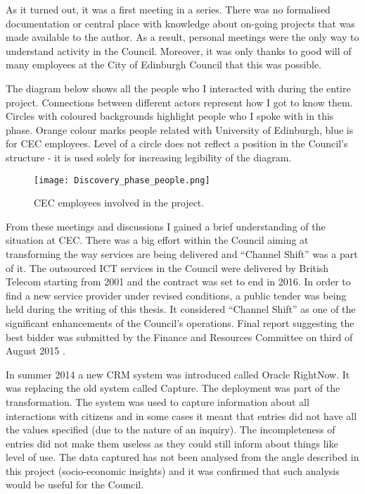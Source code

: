 As it turned out, it was a first meeting in a series. There was no formalised documentation or central place with knowledge about on-going projects that was made available to the author. As a result, personal meetings were the only way to understand activity in the Council. Moreover, it was only thanks to good will of many employees at the City of Edinburgh Council that this was possible.

The diagram below shows all the people who I interacted with during the entire project. Connections between different actors represent how I got to know them. Circles with coloured backgrounds highlight people who I spoke with in this phase. Orange colour marks people related with University of Edinburgh, blue is for CEC employees. Level of a circle does not reflect a position in the Council’s structure - it is used solely for increasing legibility of the diagram.

\begin{figure}
\centering
     \texttt{[image: Discovery\_phase\_people.png]}
      \caption{CEC employees involved in the project.}
       \label{normal_case}
\end{figure}


From these meetings and discussions I gained a brief understanding of the situation at CEC. There was a big effort within the Council aiming at transforming the way services are being delivered and “Channel Shift” was a part of it. The outsourced ICT services in the Council were delivered by British Telecom starting from 2001 and the contract was set to end in 2016. In order to find a new service provider under revised conditions, a public tender was being held during the writing of this thesis. It considered “Channel Shift” as one of the significant enhancements of the Council’s operations. Final report suggesting the best bidder was submitted by the Finance and Resources Committee on third of August 2015 \citep{FinanceandResourcesCommittee2016}.

In summer 2014 a new CRM system was introduced called Oracle RightNow. It was replacing the old system called Capture. The deployment was part of the transformation. The system was used to capture information about all interactions with citizens and in some cases it meant that entries did not have all the values specified (due to the nature of an inquiry). The incompleteness of entries did not make them useless as they could still inform about things like level of use. The data captured has not been analysed from the angle described in this project (socio-economic insights) and it was confirmed that such analysis would be useful for the Council.

